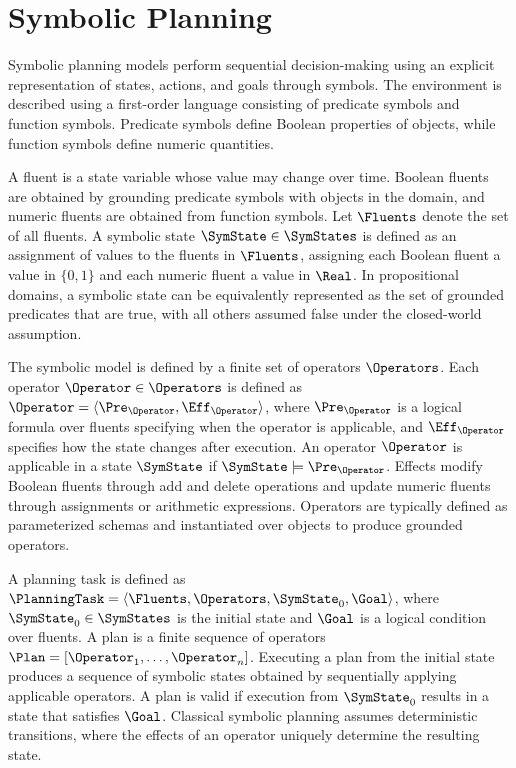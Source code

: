 \section{Symbolic Planning}
\label{sec:symbolic_planning}

Symbolic planning models perform sequential decision-making using an explicit representation of states, actions, and goals through symbols. The environment is described using a first-order language consisting of predicate symbols and function symbols. Predicate symbols define Boolean properties of objects, while function symbols define numeric quantities.

A fluent is a state variable whose value may change over time. Boolean fluents are obtained by grounding predicate symbols with objects in the domain, and numeric fluents are obtained from function symbols. Let $\Fluents$ denote the set of all fluents. A symbolic state $\SymState \in \SymStates$ is defined as an assignment of values to the fluents in $\Fluents$, assigning each Boolean fluent a value in $\{0,1\}$ and each numeric fluent a value in $\Real$. In propositional domains, a symbolic state can be equivalently represented as the set of grounded predicates that are true, with all others assumed false under the closed-world assumption.

The symbolic model is defined by a finite set of operators $\Operators$. Each operator $\Operator \in \Operators$ is defined as $\Operator = \langle \Pre_{\Operator}, \Eff_{\Operator} \rangle$, where $\Pre_{\Operator}$ is a logical formula over fluents specifying when the operator is applicable, and $\Eff_{\Operator}$ specifies how the state changes after execution. An operator $\Operator$ is applicable in a state $\SymState$ if $\SymState \models \Pre_{\Operator}$. Effects modify Boolean fluents through add and delete operations and update numeric fluents through assignments or arithmetic expressions. Operators are typically defined as parameterized schemas and instantiated over objects to produce grounded operators.

A planning task is defined as $\PlanningTask = \langle \Fluents, \Operators, \SymState_0, \Goal \rangle$, where $\SymState_0 \in \SymStates$ is the initial state and $\Goal$ is a logical condition over fluents. A plan is a finite sequence of operators $\Plan = [\Operator_1, \dots, \Operator_n]$. Executing a plan from the initial state produces a sequence of symbolic states obtained by sequentially applying applicable operators. A plan is valid if execution from $\SymState_0$ results in a state that satisfies $\Goal$. Classical symbolic planning assumes deterministic transitions, where the effects of an operator uniquely determine the resulting state.

